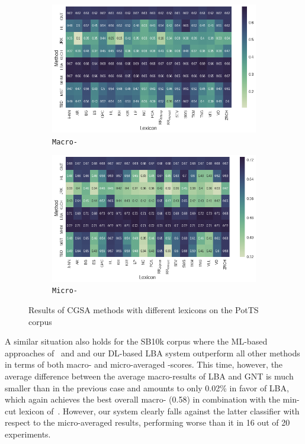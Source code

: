 \begin{figure}
{
\centering
\begin{subfigure}{.5\textwidth}
  \centering
  \includegraphics[width=\linewidth]{img/cgsa_potts_macro_lexicons.png}
  \caption{\texttt{Macro-\F{}}}\label{cgsa:fig:potts-lexicon-macro}
\end{subfigure}%
\begin{subfigure}{.5\textwidth}
  \centering
  \includegraphics[width=\linewidth]{img/cgsa_potts_micro_lexicons.png}
  \caption{\texttt{Micro-\F{}}}\label{cgsa:fig:potts-lexicon-micro}
\end{subfigure}
}
\caption[PotTS Results with different lexicons]{Results of CGSA
  methods with different lexicons on the PotTS
  corpus}\label{cgsa:fig:potts-lexicon-effect}
\end{figure}

A similar situation also holds for the SB10k corpus where the ML-based
approaches of~\citet{Mohammad:13} and \citet{Guenther:14} and our
DL-based LBA system outperform all other methods in terms of both
macro- and micro-averaged \F{}-scores.  This time, however, the
average difference between the average macro-results of LBA and GNT is
much smaller than in the previous case and amounts to only 0.02\% in
favor of LBA, which again achieves the best overall macro-\F{} (0.58)
in combination with the min-cut lexicon of~\citet{Rao:09}.  However,
our system clearly falls against the latter classifier with respect to
the micro-averaged results, performing worse than it in 16 out of 20
experiments.

